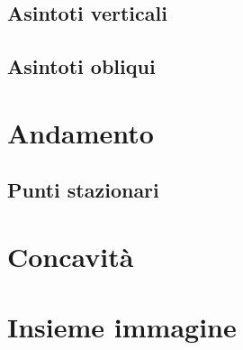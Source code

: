 \subsection{Asintoti verticali}

\subsection{Asintoti obliqui}


\section{Andamento}
\label{sec:03_andamento}

\subsection{Punti stazionari}


\section{Concavità}
\label{sec:04_concavita}


\section{Insieme immagine}
\label{sec:05_insiemeimmagine}

